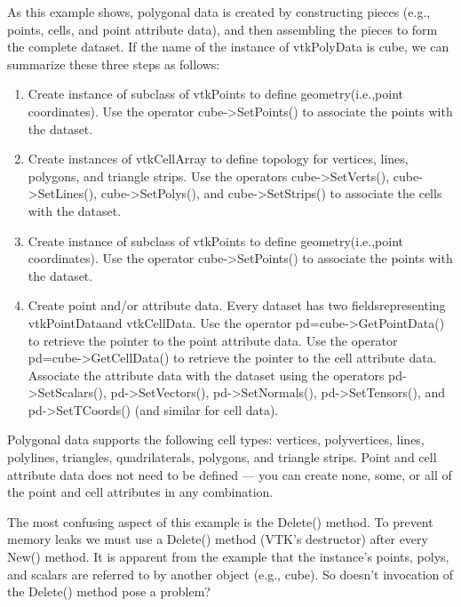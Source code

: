 As this example shows, polygonal data is created by constructing pieces (e.g., points, cells, and point attribute data), and then assembling the pieces to form the complete dataset. If the name of the instance of vtkPolyData is cube, we can summarize these three steps as follows:

\begin{enumerate}

	\item Create instance of subclass of vtkPoints to define geometry(i.e.,point coordinates). Use the operator cube->SetPoints() to associate the points with the dataset.

	\item Create instances of vtkCellArray to define topology for vertices, lines, polygons, and triangle strips. Use the operators cube->SetVerts(), cube->SetLines(), cube->SetPolys(), and cube->SetStrips() to associate the cells with the dataset.

	\item Create instance of subclass of vtkPoints to define geometry(i.e.,point coordinates). Use the operator cube->SetPoints() to associate the points with the dataset.

	\item Create point and/or attribute data. Every dataset has two fieldsrepresenting vtkPointDataand vtkCellData. Use the operator pd=cube->GetPointData() to retrieve the pointer to the point attribute data. Use the operator pd=cube->GetCellData() to retrieve the pointer to the cell attribute data. Associate the attribute data with the dataset using the operators pd->SetScalars(), pd->SetVectors(), pd->SetNormals(), pd->SetTensors(), and pd->SetTCoords() (and similar for cell data).

\end{enumerate}

Polygonal data supports the following cell types: vertices, polyvertices, lines, polylines, triangles, quadrilaterals, polygons, and triangle strips. Point and cell attribute data does not need to be defined — you can create none, some, or all of the point and cell attributes in any combination.

The most confusing aspect of this example is the Delete() method. To prevent memory leaks we must use a Delete() method (VTK’s destructor) after every New() method. It is apparent from the example that the instance’s points, polys, and scalars are referred to by another object (e.g., cube). So doesn’t invocation of the Delete() method pose a problem?

